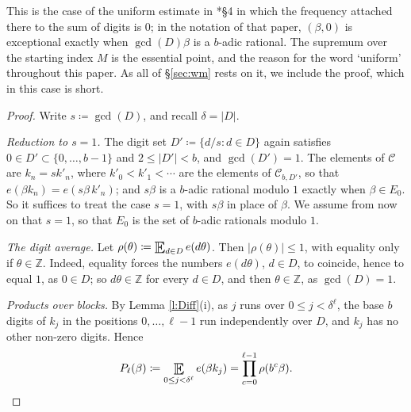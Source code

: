 This is the case of the uniform estimate in \cite{firstpaper}*{\S 4} in which the frequency attached there to the sum of digits is $0$; 
in the notation of that paper, $( \beta ,0)$ is exceptional exactly when $\gcd(D)\beta$ is a $b$-adic rational.  
The supremum over the starting index $M$ is the essential point, and the reason for the word `uniform' throughout this paper.  
As all of \S\ref{sec:wm} rests on it, we include the proof, which in this case is short.  

\begin{proof}
Write $s \coloneqq \gcd(D)$, and recall $\delta = \lvert D\rvert$.  

\emph{Reduction to $s=1$.}  The digit set $D' \coloneqq \{d/s \colon d \in D\}$ again satisfies $0 \in D' \subset \{0 , \ldots, b-1\}$ and $2 \leq \lvert D'\rvert < b$, and $\gcd(D')=1$.  
The elements of $\mathcal C$ are $k_n = s k'_n$, where $k'_0 < k'_1 < \cdots$ are the elements of $\mathcal C_{b,D'}$, so that $e(\beta k_n) = e(s\beta\, k'_n)$; 
and $s\beta$ is a $b$-adic rational modulo $1$ exactly when $\beta \in E_0$.  
So it suffices to treat the case $s=1$, with $s\beta$ in place of $\beta$.  We assume from now on that $s=1$, so that $E_0$ is the set of $b$-adic rationals modulo $1$.  

\emph{The digit average.}  Let $\rho (\theta) \coloneqq \Expectation_{d \in D} e(d\theta)$.  Then $\lvert \rho (\theta)\rvert \leq 1$, with equality only if $\theta \in \mathbb Z$.  
Indeed, equality forces the numbers $e(d\theta)$, $d \in D$, to coincide, hence to equal $1$, as $0 \in D$; 
so $d\theta \in \mathbb Z$ for every $d \in D$, and then $\theta \in \mathbb Z$, as $\gcd(D)=1$.  

\emph{Products over blocks.}  By Lemma \ref{l:Diff}(i), as $j$ runs over $0 \leq j < \delta ^{\ell}$, the base $b$ digits of $k_j$ in the positions $0 , \ldots, \ell-1$ 
run independently over $D$, and $k_j$ has no other non-zero digits.  Hence 
\begin{equation} \label{e:Pell}
P_\ell (\beta) \coloneqq \Expectation_{0\leq j<\delta ^{\ell}} e(\beta k_j) = \prod_{c=0}^{\ell-1} \rho (b ^{c}\beta) . 
\end{equation}


\end{proof}

